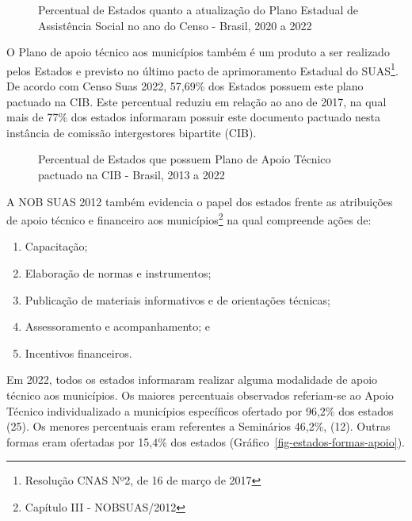 \documentclass[
  letterpaper,
  DIV=11,
  numbers=noendperiod]{scrreprt}
\providecommand{\tightlist}{%
  \setlength{\itemsep}{0pt}\setlength{\parskip}{0pt}}\usepackage{longtable,booktabs,array}
\begin{document}
\begin{figure}


\caption{\label{fig-PEAS}Percentual de Estados quanto a atualização do
Plano Estadual de Assistência Social no ano do Censo - Brasil, 2020 a
2022}

\end{figure}%

O Plano de apoio técnico aos municípios também é um produto a ser
realizado pelos Estados e previsto no último pacto de aprimoramento
Estadual do SUAS\footnote{Resolução CNAS Nº2, de 16 de março de 2017}.
De acordo com Censo Suas 2022, 57,69\% dos Estados possuem este plano
pactuado na CIB. Este percentual reduziu em relação ao ano de 2017, na
qual mais de 77\% dos estados informaram possuir este documento pactuado
nesta instância de comissão intergestores bipartite (CIB).

\begin{figure}


\caption{\label{fig-plan_apoio_tec}Percentual de Estados que possuem
Plano de Apoio Técnico pactuado na CIB - Brasil, 2013 a 2022}

\end{figure}%

A NOB SUAS 2012 também evidencia o papel dos estados frente as
atribuições de apoio técnico e financeiro aos municípios\footnote{Capítulo
  III - NOBSUAS/2012} na qual compreende ações de:

\begin{enumerate}
\def\labelenumi{\Roman{enumi})}
\tightlist
\item
  Capacitação;
\item
  Elaboração de normas e instrumentos;
\item
  Publicação de materiais informativos e de orientações técnicas;
\item
  Assessoramento e acompanhamento; e
\item
  Incentivos financeiros.
\end{enumerate}

Em 2022, todos os estados informaram realizar alguma modalidade de apoio
técnico aos municípios. Os maiores percentuais observados referiam-se ao
Apoio Técnico individualizado a municípios específicos ofertado por
96,2\% dos estados (25). Os menores percentuais eram referentes a
Seminários 46,2\%, (12). Outras formas eram ofertadas por 15,4\% dos
estados (Gráfico~\ref{fig-estados-formas-apoio}).
\end{document}
